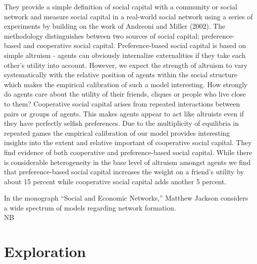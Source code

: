 \documentclass[10pt,oneside]{memoir}
\begin{document}
They provide a simple definition of social capital with a community or social network and measure social capital in a real-world social network using a series of experiments by building on the work of Andreoni and Miller (2002).
The methodology distinguishes between two sources of social capital: preference- based and cooperative social capital. Preference-based social capital is based on simple altruism - agents can obviously internalize externalities if they take each other's utility into account. However, we expect the strength of altruism to vary systematically with the relative position of agents within the social structure which makes the empirical calibration of such a model interesting. How strongly do agents care about the utility of their friends, cliques or people who live close to them?
Cooperative social capital arises from repeated interactions between pairs or groups of agents. This makes agents appear to act like altruists even if they have perfectly selfish preferences. Due to the multiplicity of equilibria in repeated games the empirical calibration of our model provides interesting insights into the extent and relative important of cooperative social capital.
They find evidence of both cooperative and preference-based social capital. While there is considerable heterogeneity in the base level of altruism amongst agents we find that preference-based social capital increases the weight on a friend's utility by about 15 percent while cooperative social capital adds another 5 percent.


In the monograph ``Social and Economic Networks,'' Matthew Jackson considers a wide spectrum of models regarding network formation. \\
NB


\pagebreak \chapter{Exploration}
\label{exploration}

\label{chapter:exploration}
\end{document}
